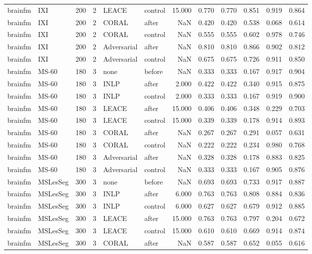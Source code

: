 \begin{tabular}{llrrllrrrrrr}
brainfm & IXI & 200 & 2 & LEACE & control & 15.000 & 0.770 & 0.770 & 0.851 & 0.919 & 0.864 \\
brainfm & IXI & 200 & 2 & CORAL & after & NaN & 0.420 & 0.420 & 0.538 & 0.068 & 0.614 \\
brainfm & IXI & 200 & 2 & CORAL & control & NaN & 0.555 & 0.555 & 0.602 & 0.978 & 0.746 \\
brainfm & IXI & 200 & 2 & Adversarial & after & NaN & 0.810 & 0.810 & 0.866 & 0.902 & 0.812 \\
brainfm & IXI & 200 & 2 & Adversarial & control & NaN & 0.675 & 0.675 & 0.726 & 0.911 & 0.850 \\
brainfm & MS-60 & 180 & 3 & none & before & NaN & 0.333 & 0.333 & 0.167 & 0.917 & 0.904 \\
brainfm & MS-60 & 180 & 3 & INLP & after & 2.000 & 0.422 & 0.422 & 0.340 & 0.915 & 0.875 \\
brainfm & MS-60 & 180 & 3 & INLP & control & 2.000 & 0.333 & 0.333 & 0.167 & 0.919 & 0.900 \\
brainfm & MS-60 & 180 & 3 & LEACE & after & 15.000 & 0.406 & 0.406 & 0.348 & 0.229 & 0.703 \\
brainfm & MS-60 & 180 & 3 & LEACE & control & 15.000 & 0.339 & 0.339 & 0.178 & 0.914 & 0.893 \\
brainfm & MS-60 & 180 & 3 & CORAL & after & NaN & 0.267 & 0.267 & 0.291 & 0.057 & 0.631 \\
brainfm & MS-60 & 180 & 3 & CORAL & control & NaN & 0.222 & 0.222 & 0.234 & 0.980 & 0.768 \\
brainfm & MS-60 & 180 & 3 & Adversarial & after & NaN & 0.328 & 0.328 & 0.178 & 0.883 & 0.825 \\
brainfm & MS-60 & 180 & 3 & Adversarial & control & NaN & 0.333 & 0.333 & 0.167 & 0.905 & 0.876 \\
brainfm & MSLesSeg & 300 & 3 & none & before & NaN & 0.693 & 0.693 & 0.733 & 0.917 & 0.887 \\
brainfm & MSLesSeg & 300 & 3 & INLP & after & 6.000 & 0.763 & 0.763 & 0.808 & 0.884 & 0.836 \\
brainfm & MSLesSeg & 300 & 3 & INLP & control & 6.000 & 0.627 & 0.627 & 0.679 & 0.912 & 0.885 \\
brainfm & MSLesSeg & 300 & 3 & LEACE & after & 15.000 & 0.763 & 0.763 & 0.797 & 0.204 & 0.672 \\
brainfm & MSLesSeg & 300 & 3 & LEACE & control & 15.000 & 0.610 & 0.610 & 0.669 & 0.914 & 0.874 \\
brainfm & MSLesSeg & 300 & 3 & CORAL & after & NaN & 0.587 & 0.587 & 0.652 & 0.055 & 0.616 \\

\end{tabular}
